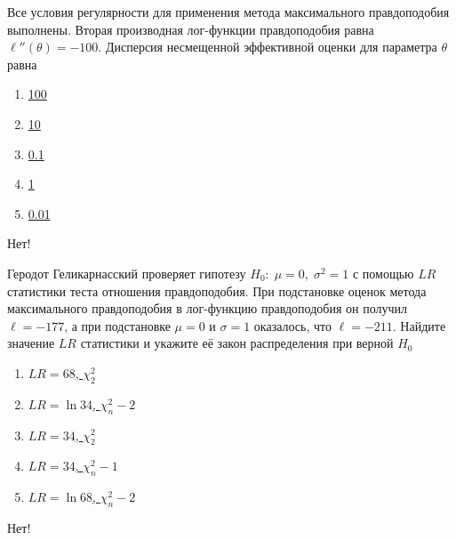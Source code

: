 \documentclass[t]{beamer}
\begin{document}
 \begin{frame} \label{18-No} 
\begin{block}{18} 

Все условия регулярности для применения метода максимального правдоподобия выполнены. Вторая производная лог-функции правдоподобия равна $\ell''(\theta)=-100$. Дисперсия несмещенной эффективной оценки для параметра $\theta$ равна
 


 \end{block} 
\begin{enumerate} 
\item[] \hyperlink{18-No}{\beamergotobutton{} 100}
\item[] \hyperlink{18-No}{\beamergotobutton{} 10}
\item[] \hyperlink{18-No}{\beamergotobutton{} 0.1}
\item[] \hyperlink{18-No}{\beamergotobutton{} 1}
\item[] \hyperlink{18-Yes}{\beamergotobutton{} 0.01}
\end{enumerate} 

 \alert{Нет!} 
\end{frame} 


 \begin{frame} \label{19-No} 
\begin{block}{19} 

Геродот Геликарнасский проверяет гипотезу $H_0: \; \mu=0, \; \sigma^2=1$ с помощью $LR$ статистики теста отношения правдоподобия. При подстановке оценок метода максимального правдоподобия в лог-функцию правдоподобия он получил $\ell=-177$, а при подстановке $\mu=0$ и $\sigma=1$ оказалось, что $\ell=-211$. Найдите значение $LR$ статистики и укажите её закон распределения при верной $H_0$
 


 \end{block} 
\begin{enumerate} 
\item[] \hyperlink{19-Yes}{\beamergotobutton{} $LR=68$, $\chi^2_2$}
\item[] \hyperlink{19-No}{\beamergotobutton{} $LR=\ln 34$, $\chi^2_n-2$}
\item[] \hyperlink{19-No}{\beamergotobutton{} $LR=34$, $\chi^2_2$}
\item[] \hyperlink{19-No}{\beamergotobutton{} $LR=34$, $\chi^2_n-1$}
\item[] \hyperlink{19-No}{\beamergotobutton{} $LR=\ln 68$, $\chi^2_n-2$}
\end{enumerate} 

 \alert{Нет!} 
\end{frame} 
\end{document}
